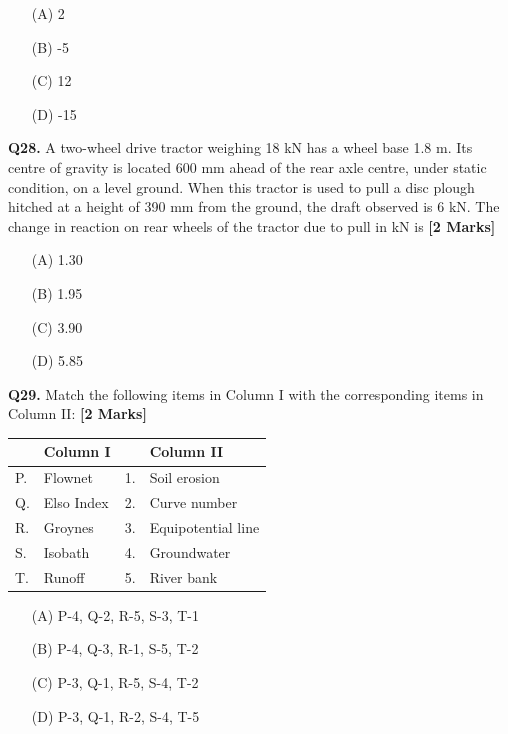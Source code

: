 \documentclass[11pt]{article}
\newcommand{\questionb}[2]{
    \noindent\textbf{Q#2.} #1 \hfill \textbf{[2 Marks]}
}
\begin{document}
\begin{enumerate}
    \item[(A)] 2  
    \item[(B)] -5  
    \item[(C)] 12  
    \item[(D)] -15  
\end{enumerate}
\vspace{0.5cm}

\questionb{A two-wheel drive tractor weighing 18 kN has a wheel base 1.8 m. Its centre of gravity is located 600 mm ahead of the rear axle centre, under static condition, on a level ground. When this tractor is used to pull a disc plough hitched at a height of 390 mm from the ground, the draft observed is 6 kN. The change in reaction on rear wheels of the tractor due to pull in kN is}{28}
\begin{enumerate}
    \item[(A)] 1.30  
    \item[(B)] 1.95  
    \item[(C)] 3.90  
    \item[(D)] 5.85  
\end{enumerate}
\vspace{0.5cm}

\questionb{Match the following items in Column I with the corresponding items in Column II:}{29}
\begin{center}
\begin{tabular}{|l|l|l|l|}
\hline
 & Column I & & Column II \\
\hline
P. & Flownet & 1. & Soil erosion \\
Q. & Elso Index & 2. & Curve number \\
R. & Groynes & 3. & Equipotential line \\
S. & Isobath & 4. & Groundwater \\
T. & Runoff & 5. & River bank \\
\hline
\end{tabular}
\end{center}
\begin{enumerate}
    \item[(A)] P-4, Q-2, R-5, S-3, T-1  
    \item[(B)] P-4, Q-3, R-1, S-5, T-2  
    \item[(C)] P-3, Q-1, R-5, S-4, T-2  
    \item[(D)] P-3, Q-1, R-2, S-4, T-5  
\end{enumerate}
\vspace{0.5cm}
\end{document}
